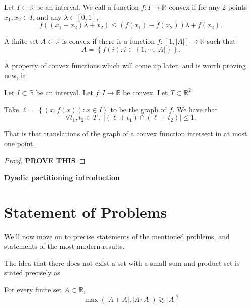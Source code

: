 \documentclass[12pt,reqno]{amsart}
\begin{document}
Let \(I \subset \mathbb{R} \) be an interval. 
    We call a function \(f: I \to \mathbb{R} \) convex if for
    any 2 points \(x_1,x_2 \in I\), and any \(\lambda \in [0,1]\),
    \[
        f((x_1-x_2)\lambda + x_2) \leq \left( f(x_1)-f(x_2) \right) \lambda + f(x_2)
    .\]

    A finite set \(A \subset \mathbb{R}\) is convex if there is a function \(f: [1, \left\lvert A \right\rvert ] \to \mathbb{R} \)
such that
\[
    A = \left\{ f(i) : i \in \left\{ 1, \cdots , \left\lvert A \right\rvert  \right\}  \right\} 
.\]

A property of convex functions which will come up later, and is worth proving now, is
\begin{lemma}
Let \(I \subset \mathbb{R} \) be an interval. Let \(f : I \to \mathbb{R} \) be convex. Let \(T \subset \mathbb{R} ^{2}\).

Take \(\ell  = \left\{ (x,f(x)) : x \in I \right\} \) to be the graph of \(f\). We have that
\[
    \forall t_1,t_2 \in T ~,~ \left\lvert \left( \ell + t_1 \right) \cap \left( \ell +  t_2 \right)  \right\rvert   \leq  1
.\]

That is that translations of the graph of a convex function intersect in at most one point.
\end{lemma}

\begin{proof}
\textbf{PROVE THIS}
\end{proof}

\textbf{Dyadic partitioning introduction}



\section{Statement of Problems}

We'll now move on to precise statements of the mentioned problems, and statements of the most modern results.

The idea that there does not exist a set with a small sum and product set is
stated precisely as
\begin{conjecture}
For every finite set \(A \subset \mathbb{R} \),
\[
    \max \left( \left\lvert A+A \right\rvert, \left\lvert A \cdot A \right\rvert  \right) \gtrsim   \left\lvert A \right\rvert^{2}
\]
\end{conjecture}
\end{document}
